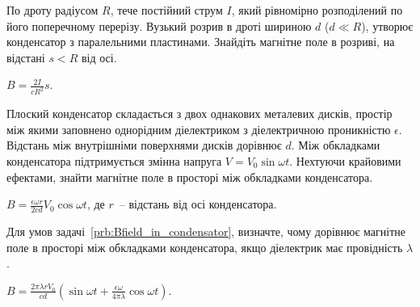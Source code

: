 
\begin{problem}\label{prb:Griffiths7.34}
По дроту радіусом $R$, тече постійний струм $I$, який рівномірно розподілений по його поперечному перерізу. Вузький розрив в дроті шириною $d$ ($d \ll R$), утворює конденсатор з паралельними пластинами. Знайдіть магнітне поле в розриві, на відстані $s < R$ від осі.
\begin{solution}
	$B = \frac{2I}{cR^2}s$.
\end{solution}
\end{problem}


\begin{problem}\label{prb:Bfield_in_condensator}
Плоский конденсатор складається з двох однакових металевих дисків, простір між якими заповнено однорідним діелектриком з діелектричною проникністю $\epsilon$. Відстань між внутрішніми поверхнями дисків дорівнює $d$. Між обкладками конденсатора підтримується змінна напруга $V = V_0\sin\omega t$. Нехтуючи крайовими ефектами, знайти магнітне поле в просторі між обкладками конденсатора.
\begin{solution}
	$B = \frac{\epsilon\omega r}{2cd}V_0\cos\omega t$, де $r$~-- відстань від осі конденсатора.
\end{solution}
 \end{problem}

\begin{problem}\label{prb:Bfield_in_condensator_with_currnet}
    Для умов задачі~\ref{prb:Bfield_in_condensator}, визначте, чому дорівнює  магнітне поле в просторі між обкладками конденсатора, якщо діелектрик має провідність $\lambda$.
\begin{solution}
	$B = \frac{2\pi\lambda r V_0}{cd}\left( \sin\omega t + \frac{\epsilon \omega}{4\pi\lambda}\cos\omega t\right) $.
\end{solution}
\end{problem}


